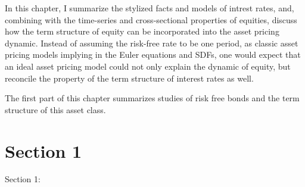 \minitoc

\vspace{0.5cm}

In this chapter, I summarize the stylized facts and models of intrest rates, 
and, combining with the time-series and cross-sectional properties of equities, 
discuss how the term structure of equity can be incorporated into the asset pricing
dynamic. Instead of assuming the risk-free rate to be one period, as classic 
asset pricing models implying in the Euler equations and SDFs, one would expect that
an ideal asset pricing model could not only explain the dynamic of equity, but
 reconcile the property of the term structure of interest rates as well.

The first part of this chapter summarizes studies of risk free bonds and the term structure
of this asset class. 

\section{Section 1}
Section 1: